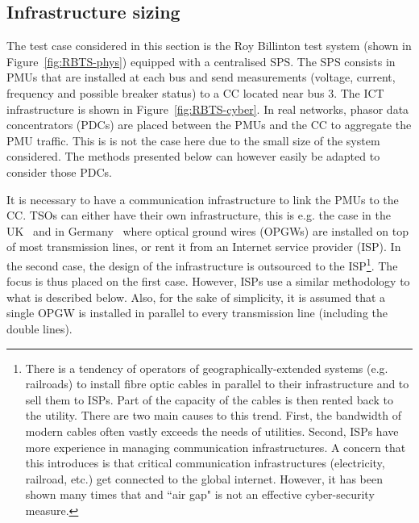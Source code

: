 \subsection{Infrastructure sizing}
\label{sec:ICTsizing}

The test case considered in this section is the Roy Billinton test system (shown in Figure~\ref{fig:RBTS-phys}) equipped with a centralised SPS. The SPS consists in PMUs that are installed at each bus and send measurements (voltage, current, frequency and possible breaker status) to a CC located near bus 3. The ICT infrastructure is shown in Figure~\ref{fig:RBTS-cyber}. In real networks, phasor data concentrators (PDCs) are placed between the PMUs and the CC to aggregate the PMU traffic. This is is not the case here due to the small size of the system considered. The methods presented below can however easily be adapted to consider those PDCs.

It is necessary to have a communication infrastructure to link the PMUs to the CC. TSOs can either have their own infrastructure, this is e.g. the case in the UK~\cite[p110]{bookUK_OPGW} and in Germany~\cite[p42]{ThesisInspire} where optical ground wires (OPGWs) are installed on top of most transmission lines, or rent it from an Internet service provider (ISP). In the second case, the design of the infrastructure is outsourced to the ISP\footnote{There is a tendency of operators of geographically-extended systems (e.g. railroads) to install fibre optic cables in parallel to their infrastructure and to sell them to ISPs. Part of the capacity of the cables is then rented back to the utility. There are two main causes to this trend. First, the bandwidth of modern cables often vastly exceeds the needs of utilities. Second, ISPs have more experience in managing communication infrastructures. A concern that this introduces is that critical communication infrastructures (electricity, railroad, etc.) get connected to the global internet. However, it has been shown many times that and ``air gap" is not an effective cyber-security measure.}. The focus is thus placed on the first case. However, ISPs use a similar methodology to what is described below. Also, for the sake of simplicity, it is assumed that a single OPGW is installed in parallel to every transmission line (including the double lines).

